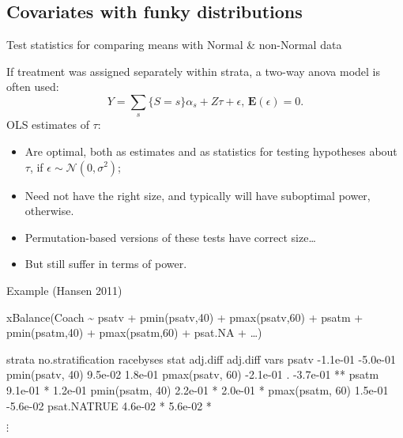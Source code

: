 \subsection{Covariates with funky distributions}


\begin{frame}{Test statistics for comparing means with Normal \& non-Normal data}

If treatment was assigned separately within strata, a two-way anova model is often used:
$$
Y = \sum_{s}\{S=s\}\alpha_{s} + Z\tau + \epsilon,\, \mathbf{E}(\epsilon) = 0.
$$
OLS estimates of $\tau$:
\begin{itemize}[<+->]
  \item Are optimal, both as estimates and as statistics for testing hypotheses about $\tau$, if $\epsilon \sim \mathcal{N}(0, \sigma^{2})$;
  \item Need not have the right size, and typically will have suboptimal power, otherwise.
  \item Permutation-based versions of these tests have correct size\ldots
  \item But still suffer in terms of power.
\end{itemize}

\end{frame}


\begin{frame}[fragile]{Example (Hansen 2011)}

{\small
\begin{semiverbatim}
xBalance(Coach \textasciitilde 
         psatv + pmin(psatv,40) + pmax(psatv,60) + 
         psatm + pmin(psatm,40) + pmax(psatm,60) + 
         psat.NA + \ldots) 

                    strata no.stratification          racebyses         
                     stat            adj.diff           adj.diff         
vars                                                                     
psatv                                -1.1e-01           -5.0e-01         
pmin(psatv, 40)                      9.5e-02            1.8e-01          
pmax(psatv, 60)                      -2.1e-01 .         -3.7e-01 **      
psatm                                9.1e-01  *         1.2e-01          
pmin(psatm, 40)                      2.2e-01  *         2.0e-01  *       
pmax(psatm, 60)                      1.5e-01            -5.6e-02         
psat.NATRUE                          4.6e-02  *         5.6e-02  *       
\end{semiverbatim}
$\vdots$    

}


  
\end{frame}

